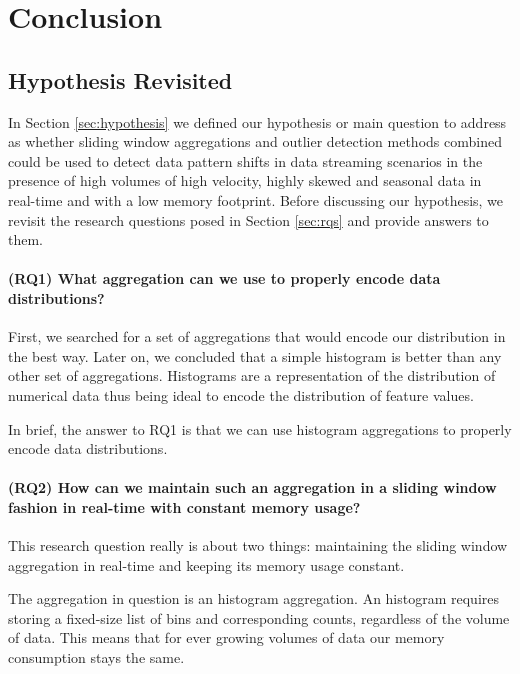 \chapter{Conclusion} \label{chap:conclusion} \minitoc

\section{Hypothesis Revisited}

In Section \ref{sec:hypothesis} we defined our hypothesis or main question to address as whether sliding window aggregations and outlier detection methods combined could be used to detect data pattern shifts in data streaming scenarios in the presence of high volumes of high velocity, highly skewed and seasonal data in real-time and with a low memory footprint. Before discussing our hypothesis, we revisit the research questions posed in Section \ref{sec:rqs} and provide answers to them. 

\subsubsection*{(RQ1) What aggregation can we use to properly encode data distributions?}
First, we searched for a set of aggregations that would encode our distribution in the best way. Later on, we concluded that a simple histogram is better than any other set of aggregations. Histograms are a representation of the distribution of numerical data thus being ideal to encode the distribution of feature values. 

In brief, the answer to RQ1 is that we can use histogram aggregations to properly encode data distributions.

\subsubsection*{(RQ2) How can we maintain such an aggregation in a sliding window fashion in real-time with constant memory usage?}

This research question really is about two things: maintaining the sliding window aggregation in real-time and keeping its memory usage constant.

The aggregation in question is an histogram aggregation.
An histogram requires storing a fixed-size list of bins and corresponding counts, regardless of the volume of data. This means that for ever growing volumes of data our memory consumption stays the same.

